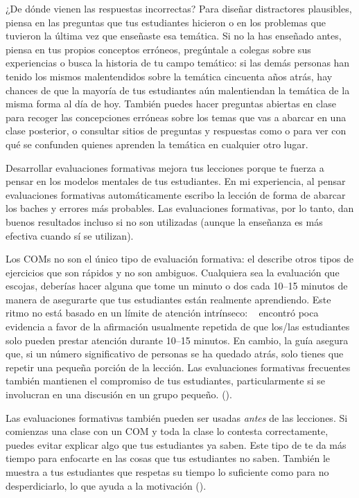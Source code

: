 \begin{aside}{¿De dónde vienen las respuestas incorrectas?}
 Para diseñar distractores plausibles,
piensa en las preguntas que tus estudiantes hicieron o en los problemas que tuvieron la última vez que enseñaste esa temática.
Si no la has enseñado antes,
piensa en tus propios conceptos erróneos,
pregúntale a colegas sobre sus experiencias
o busca la historia de tu campo temático:
si las demás personas han tenido los mismos malentendidos sobre la temática cincuenta años atrás,
hay chances de que la mayoría de tus estudiantes aún malentiendan la temática de la misma forma al día de hoy.
También puedes hacer preguntas abiertas en clase
para recoger las concepciones erróneas sobre los temas que vas a abarcar en una clase posterior,
o consultar sitios de preguntas y respuestas como 
  o 
  para ver con qué se confunden quienes aprenden la temática en cualquier otro lugar.
\end{aside}

Desarrollar evaluaciones formativas mejora tus lecciones
porque te fuerza a pensar en los modelos mentales de tus estudiantes.
En mi experiencia,
al pensar evaluaciones formativas automáticamente escribo la lección de forma de abarcar los baches y errores más probables.
Las evaluaciones formativas, por lo tanto, dan buenos resultados incluso si no son utilizadas
(aunque la enseñanza es más efectiva cuando sí se utilizan).

Los COMs no son el único tipo de evaluación formativa:
el  describe otros tipos de ejercicios que son rápidos y no son ambiguos.
Cualquiera sea la evaluación que escojas,
deberías hacer alguna que tome un minuto o dos cada 10--15 minutos
de manera de asegurarte que tus estudiantes están realmente aprendiendo.
Este ritmo no está basado en un límite de atención intrínseco: ~\cite{Wils2007}
encontró poca evidencia a favor de la afirmación usualmente repetida de que
los/las estudiantes solo pueden prestar atención durante 10--15 minutos.
En cambio,
la guía asegura que, si un número significativo de personas se ha quedado atrás,
solo tienes que repetir una pequeña porción de la lección.
Las evaluaciones formativas frecuentes también mantienen el compromiso de tus estudiantes, 
particularmente si se involucran en una discusión en un grupo pequeño.
().

Las evaluaciones formativas también pueden ser usadas \emph{antes} de las lecciones.
Si comienzas una clase con un COM y toda la clase lo contesta correctamente,
puedes evitar explicar algo que tus estudiantes ya saben.
Este tipo de 
te da más tiempo para enfocarte en las cosas que tus estudiantes no saben.
También le muestra a tus estudiantes que respetas su tiempo lo suficiente como para no desperdiciarlo,
lo que ayuda a la motivación ().

